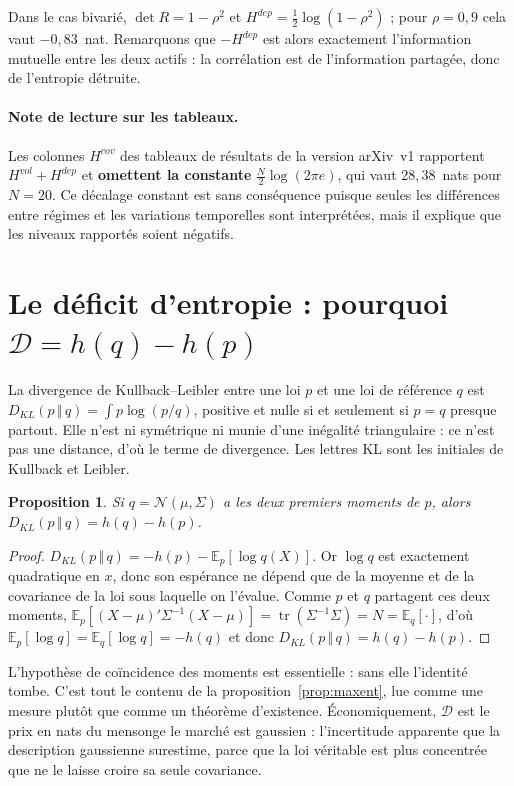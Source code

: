 \documentclass[11pt]{article}
\newtheorem{proposition}{Proposition}
\theoremstyle{definition}
\theoremstyle{remark}
\newcommand{\DD}{\mathcal{D}}
\newcommand{\KL}[2]{D_{KL}\!\left(#1\,\Vert\,#2\right)}
\begin{document}
Dans le cas bivarié, $\det R=1-\rho^2$ et $H^{dep}=\tfrac12\log(1-\rho^2)$ ; pour
$\rho=0{,}9$ cela vaut $-0{,}83$~nat. Remarquons que $-H^{dep}$ est alors
exactement l'information mutuelle entre les deux actifs : la corrélation est de
l'information partagée, donc de l'entropie détruite.

\paragraph{Note de lecture sur les tableaux.} Les colonnes $H^{cov}$ des
tableaux de résultats de la version arXiv~v1 rapportent $H^{vol}+H^{dep}$ et
\textbf{omettent la constante} $\tfrac N2\log(2\pi e)$, qui vaut $28{,}38$~nats
pour $N=20$. Ce décalage constant est sans conséquence puisque seules les
différences entre régimes et les variations temporelles sont interprétées, mais
il explique que les niveaux rapportés soient négatifs.

\section{Le déficit d'entropie : pourquoi $\DD=h(q)-h(p)$}
\label{app:deficit}

La divergence de Kullback--Leibler entre une loi $p$ et une loi de référence $q$
est $\KL{p}{q}=\int p\log(p/q)$, positive et nulle si et seulement si $p=q$
presque partout. Elle n'est ni symétrique ni munie d'une inégalité triangulaire :
ce n'est pas une distance, d'où le terme de divergence. Les lettres \og KL \fg{}
sont les initiales de Kullback et Leibler.

\begin{proposition}
\label{prop:deficit}
Si $q=\mathcal N(\mu,\Sigma)$ a \emph{les deux premiers moments de $p$}, alors
$\KL{p}{q}=h(q)-h(p)$.
\end{proposition}

\begin{proof}
$\KL{p}{q}=-h(p)-\mathbb{E}_p[\log q(X)]$. Or $\log q$ est exactement
quadratique en $x$, donc son espérance ne dépend que de la moyenne et de la
covariance de la loi sous laquelle on l'évalue. Comme $p$ et $q$ partagent ces
deux moments,
$\mathbb{E}_p\!\left[(X-\mu)'\Sigma^{-1}(X-\mu)\right]=\operatorname{tr}(\Sigma^{-1}\Sigma)=N
=\mathbb{E}_q[\cdot]$, d'où $\mathbb{E}_p[\log q]=\mathbb{E}_q[\log q]=-h(q)$ et
donc $\KL{p}{q}=h(q)-h(p)$.
\end{proof}

L'hypothèse de coïncidence des moments est essentielle : sans elle l'identité
tombe. C'est tout le contenu de la proposition~\ref{prop:maxent}, lue comme une
mesure plutôt que comme un théorème d'existence. Économiquement, $\DD$ est le
prix en nats du mensonge \og le marché est gaussien \fg{} : l'incertitude
apparente que la description gaussienne surestime, parce que la loi véritable est
plus concentrée que ne le laisse croire sa seule covariance.
\end{document}
